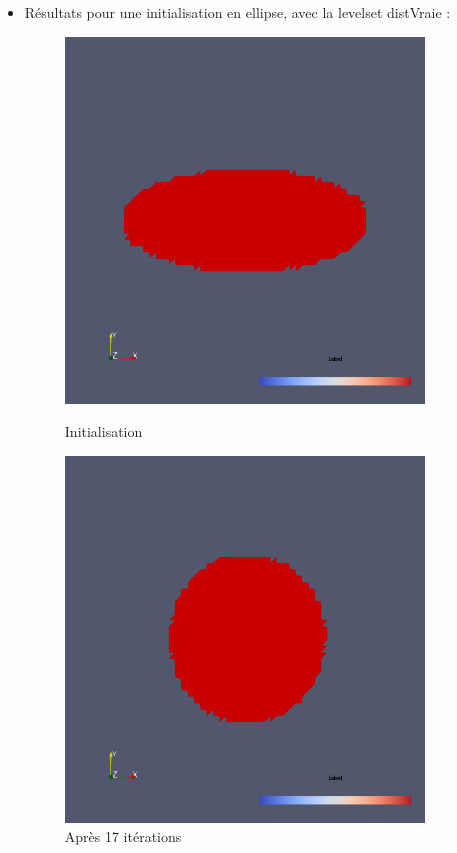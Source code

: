 \documentclass[11pt,a4paper]{article}
\begin{document}
\begin{itemize}
	\item Résultats pour une initialisation en ellipse, avec la levelset distVraie :
	\begin{figure}[H]
		\begin{minipage}{0.45\textwidth}
			\includegraphics[width=0.9\textwidth]{SansEl2DdistVraieiniCercleINI.png}
			\caption{Initialisation}
		\end{minipage}	
		\begin{minipage}{0.45\textwidth}
			\includegraphics[width=0.9\textwidth]{SansEl2DdistVraieiniCercleResit17.png}
			\caption{Après 17 itérations}
		\end{minipage}
	\end{figure}
	

\end{itemize}
\end{document}
